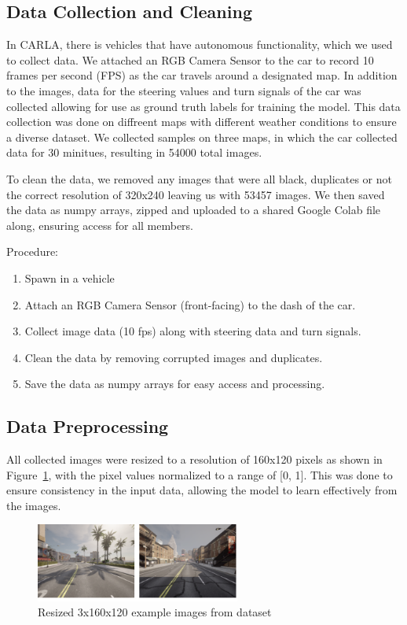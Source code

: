 \documentclass{article} %
\begin{document}
\subsection{Data Collection and Cleaning}

In CARLA, there is vehicles that have autonomous functionality, which we used to collect data.
We attached an RGB Camera Sensor to the car to record 10 frames per second (FPS) as the car
travels around a designated map. In addition to the images, data for the steering values and turn signals of the car
was collected allowing for use as ground truth labels for training the model. This data collection was done on diffreent maps with different weather conditions
to ensure a diverse dataset. We collected samples on three maps, in which the car collected data for 30 minitues, resulting in 54000 total images.


To clean the data, we removed any images that were all black, duplicates or not the correct resolution of 320x240 leaving us with 53457 images.  We then saved 
the data as numpy arrays, zipped and uploaded to a shared Google Colab file along, ensuring access for all members. 

Procedure:
\begin{enumerate}
  \item{Spawn in a vehicle}
  \item{Attach an RGB Camera Sensor (front-facing) to the dash of the car.}
  \item{Collect image data (10 fps) along with steering data and turn signals.}
  \item {Clean the data by removing corrupted images and duplicates.}
  \item {Save the data as numpy arrays for easy access and processing.}
\end{enumerate}


\subsection{Data Preprocessing}
All collected images were resized to a resolution of 160x120 pixels as shown in Figure~\ref{fig:exampleofdataset}, with the pixel values normalized to a range of [0, 1]. 
This was done to ensure consistency in the input data, allowing the model to learn effectively from the images.

\begin{figure}[H] %
    \centering
    \includegraphics[width=0.6\textwidth]{exampleofdataset.png} %
    \caption{Resized 3x160x120 example images from dataset}
    \label{fig:exampleofdataset}
\end{figure}
\end{document}
